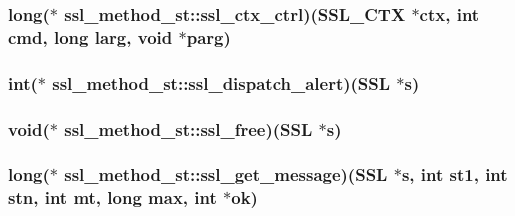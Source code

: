 \hypertarget{structssl__method__st_a61f10fd3d5215c108d31e750f48d9ec6}{
\subsubsection[{ssl\-\_\-ctx\-\_\-ctrl}]{\setlength{\rightskip}{0pt plus 5cm}long($\ast$ ssl\-\_\-method\-\_\-st\-::ssl\-\_\-ctx\-\_\-ctrl)(S\-S\-L\-\_\-\-C\-T\-X $\ast$ctx, int cmd, long larg, void $\ast$parg)}}\label{structssl__method__st_a61f10fd3d5215c108d31e750f48d9ec6}
\hypertarget{structssl__method__st_a9edf0cd5d4d18f3a0ac0250324c3cea1}{
\subsubsection[{ssl\-\_\-dispatch\-\_\-alert}]{\setlength{\rightskip}{0pt plus 5cm}int($\ast$ ssl\-\_\-method\-\_\-st\-::ssl\-\_\-dispatch\-\_\-alert)(S\-S\-L $\ast$s)}}\label{structssl__method__st_a9edf0cd5d4d18f3a0ac0250324c3cea1}
\hypertarget{structssl__method__st_aaa3352420812e9d4a769c42567bfc284}{
\subsubsection[{ssl\-\_\-free}]{\setlength{\rightskip}{0pt plus 5cm}void($\ast$ ssl\-\_\-method\-\_\-st\-::ssl\-\_\-free)(S\-S\-L $\ast$s)}}\label{structssl__method__st_aaa3352420812e9d4a769c42567bfc284}
\hypertarget{structssl__method__st_abc7d388378f3f61658ba3cb2ff8d493f}{
\subsubsection[{ssl\-\_\-get\-\_\-message}]{\setlength{\rightskip}{0pt plus 5cm}long($\ast$ ssl\-\_\-method\-\_\-st\-::ssl\-\_\-get\-\_\-message)(S\-S\-L $\ast$s, int st1, int stn, int mt, long max, int $\ast$ok)}}\label{structssl__method__st_abc7d388378f3f61658ba3cb2ff8d493f}
